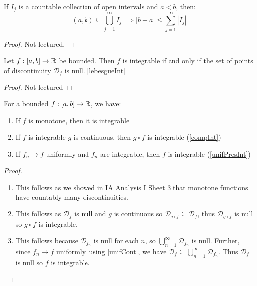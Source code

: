 \documentclass[../main.tex]{subfiles}
\begin{document}
\begin{lemma}
  If $I_j$ is a countable collection of open intervals and $a < b$, then:
  \[
    (a, b) \subseteq \bigcup_{j = 1}^{\infty} I_j \implies |b - a| \leq \sum_{j = 1}^{\infty} |I_j|
  \]
\end{lemma}
\begin{proof}
  Not lectured.
\end{proof}
\begin{theorem}
  Let $f: [a, b] \to \mathbb{R}$ be bounded.
  Then $f$ is integrable if and only if the set of points of discontinuity $\mathcal{D}_f$ is null. \cref{lebesgueInt}
\end{theorem}
\begin{proof}
  Not lectured
\end{proof}
\begin{corollary}
  For a bounded $f: [a, b] \to \mathbb{R}$, we have:
  \begin{enumerate}
    \item If $f$ is monotone, then it is integrable
    \item If $f$ is integrable $g$ is continuous, then $g \circ f$  is integrable (\cref{compInt})
    \item If $f_n \to f$ uniformly and $f_n$ are integrable, then $f$ is integrable (\cref{unifPresInt})
  \end{enumerate}
\end{corollary}
\begin{proof}
  \begin{enumerate}
    \item This follows as we showed in IA Analysis I Sheet 3 that monotone functions have countably many discontinuities.
    \item This follows as $\mathcal{D}_f$ is null and $g$ is continuous so $\mathcal{D}_{g \circ f} \subseteq \mathcal{D}_f$, thus $\mathcal{D}_{g \circ f}$ is null so $g \circ f$ is integrable.
    \item This follows because $\mathcal{D}_{f_n}$ is null for each $n$, so $\bigcup_{n = 1}^{\infty} \mathcal{D}_{f_n}$ is null.
      Further, since $f_n \to f$ uniformly, using \cref{unifCont}, we have $\mathcal{D}_f \subseteq \bigcup_{n = 1}^{\infty} \mathcal{D}_{f_n}$.
      Thus $\mathcal{D}_f$ is null so $f$ is integrable.
  \end{enumerate}
\end{proof}
\end{document}
